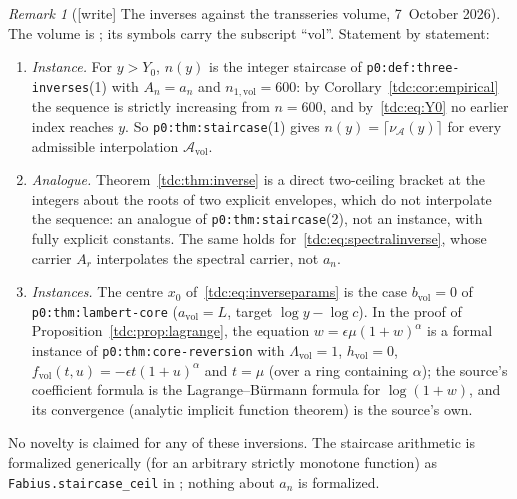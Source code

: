 \documentclass[11pt]{article}
\theoremstyle{definition}\newtheorem{definition}[theorem]{Definition}
\theoremstyle{remark}\newtheorem{remark}[theorem]{Remark}
\newcommand{\file}[1]{\nolinkurl{#1}}
\begin{document}
\begin{remark}[{[write]} The inverses against the transseries volume, 7~October 2026]\label{tdc:rem:transseries}
The volume is
;
its symbols carry the subscript ``vol''. Statement by statement:
\begin{enumerate}[label=(\alph*)]
\item \emph{Instance.} For $y>Y_0$, $n(y)$ is the integer staircase of
 \file{p0:def:three-inverses}(1) with $A_n=a_n$ and
 $n_{1,\mathrm{vol}}=600$: by Corollary~\ref{tdc:cor:empirical} the sequence
 is strictly increasing from $n=600$, and by~\eqref{tdc:eq:Y0} no earlier
 index reaches $y$. So \file{p0:thm:staircase}(1) gives
 $n(y)=\lceil\nu_{\mathcal A}(y)\rceil$ for every admissible interpolation
 $\mathcal A_{\mathrm{vol}}$.
\item \emph{Analogue.} Theorem~\ref{tdc:thm:inverse} is a direct two-ceiling
 bracket at the integers about the roots of two explicit envelopes, which do
 not interpolate the sequence: an analogue of \file{p0:thm:staircase}(2), not
 an instance, with fully explicit constants. The same holds
 for~\eqref{tdc:eq:spectralinverse}, whose carrier $A_r$ interpolates the
 spectral carrier, not $a_n$.
\item \emph{Instances.} The centre $x_0$ of~\eqref{tdc:eq:inverseparams} is the
 case $b_{\mathrm{vol}}=0$ of \file{p0:thm:lambert-core}
 ($a_{\mathrm{vol}}=L$, target $\log y-\log c$). In the proof of
 Proposition~\ref{tdc:prop:lagrange}, the equation $w=\epsilon\mu(1+w)^\alpha$
 is a formal instance of \file{p0:thm:core-reversion} with
 $\Lambda_{\mathrm{vol}}=1$, $h_{\mathrm{vol}}=0$,
 $f_{\mathrm{vol}}(t,u)=-\epsilon t(1+u)^\alpha$ and $t=\mu$ (over a ring
 containing $\alpha$); the source's coefficient formula is the
 Lagrange--B\"urmann formula for $\log(1+w)$, and its convergence (analytic
 implicit function theorem) is the source's own.
\end{enumerate}
No novelty is claimed for any of these inversions. The staircase arithmetic
is formalized generically (for an arbitrary strictly monotone function) as
\file{Fabius.staircase_ceil} in
;
nothing about $a_n$ is formalized.
\end{remark}
\end{document}
